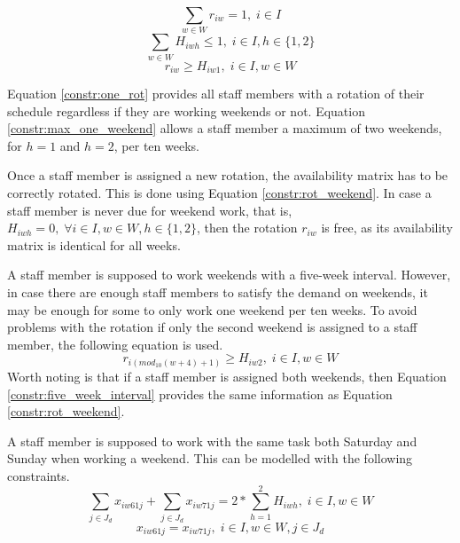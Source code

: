 \begin{equation} \label{constr:one_rot}
\sum_{w \in W} r_{iw} = 1, \;   i\in I
\end{equation}
\begin{equation} \label{constr:max_one_weekend}
\sum_{w \in W} H_{iwh} \leq 1, \;   i\in I, h \in \{1,2\}
\end{equation}
\begin{equation} \label{constr:rot_weekend}
r_{iw} \geq H_{iw1}, \;   i\in I, w \in W
\end{equation}

Equation \ref{constr:one_rot} provides all staff members with a rotation of their schedule regardless if they are working weekends or not. Equation \ref{constr:max_one_weekend} allows a staff member a maximum of two weekends, for $h=1$ and $h=2$, per ten weeks.

Once a staff member is assigned a new rotation, the availability matrix has to be correctly rotated. This is done using Equation \ref{constr:rot_weekend}. In case a staff member is never due for weekend work, that is, $H_{iwh} = 0, \; \forall i\in I, w \in W, h \in \{1,2\}$, then the rotation $r_{iw}$ is free, as its availability matrix is identical for all weeks. 

A staff member is supposed to work weekends with a five-week interval. However, in case there are enough staff members to satisfy the demand on weekends, it may be enough for some to only work one weekend per ten weeks. To avoid problems with the rotation if only the second weekend is assigned to a staff member, the following equation is used.
\begin{equation} \label{constr:five_week_interval}
r_{i(mod_{10}(w+4)+1)} \geq H_{iw2}, \;   i\in I, w \in W
\end{equation}
Worth noting is that if a staff member is assigned both weekends, then Equation \ref{constr:five_week_interval} provides the same information as Equation \ref{constr:rot_weekend}.

A staff member is supposed to work with the same task both Saturday and Sunday when working a weekend. This can be modelled with the following constraints.
\begin{equation} \label{constr:consecutive_days}
\sum_{j \in J_d} x_{iw61j} + \sum_{j \in J_d} x_{iw71j} = 2*\sum_{h = 1}^{2} H_{iwh}, \;   i\in I, w \in W
\end{equation}
\begin{equation} \label{constr:same_tasks}
x_{iw61j} = x_{iw71j}, \;   i\in I, w \in W, j \in J_d
\end{equation}

